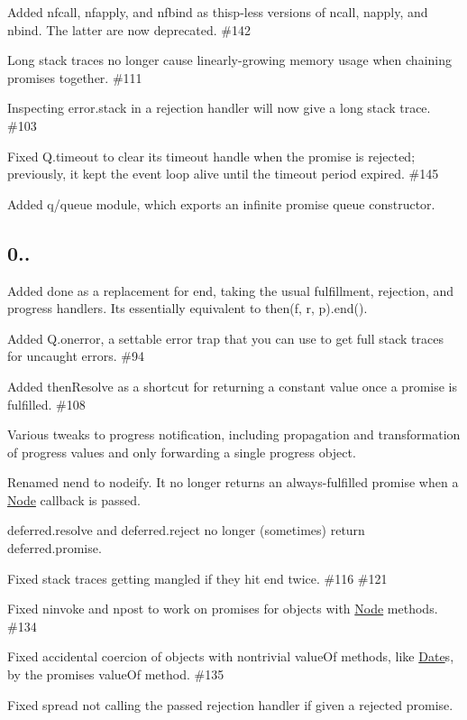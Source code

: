 \begin{DoxyItemize}
\item Added {\ttfamily nfcall}, {\ttfamily nfapply}, and {\ttfamily nfbind} as {\ttfamily thisp}-\/less versions of {\ttfamily ncall}, {\ttfamily napply}, and {\ttfamily nbind}. The latter are now deprecated. \#142
\item Long stack traces no longer cause linearly-\/growing memory usage when chaining promises together. \#111
\item Inspecting {\ttfamily error.\+stack} in a rejection handler will now give a long stack trace. \#103
\item Fixed {\ttfamily Q.\+timeout} to clear its timeout handle when the promise is rejected; previously, it kept the event loop alive until the timeout period expired. \#145 
\item Added {\ttfamily q/queue} module, which exports an infinite promise queue constructor.
\end{DoxyItemize}

\subsection*{0..}


\begin{DoxyItemize}
\item Added {\ttfamily done} as a replacement for {\ttfamily end}, taking the usual fulfillment, rejection, and progress handlers. It\textquotesingle{}s essentially equivalent to {\ttfamily then(f, r, p).end()}.
\item Added {\ttfamily Q.\+onerror}, a settable error trap that you can use to get full stack traces for uncaught errors. \#94
\item Added {\ttfamily then\+Resolve} as a shortcut for returning a constant value once a promise is fulfilled. \#108 
\item Various tweaks to progress notification, including propagation and transformation of progress values and only forwarding a single progress object.
\item Renamed {\ttfamily nend} to {\ttfamily nodeify}. It no longer returns an always-\/fulfilled promise when a \mbox{\hyperlink{classNode}{Node}} callback is passed.
\item {\ttfamily deferred.\+resolve} and {\ttfamily deferred.\+reject} no longer (sometimes) return {\ttfamily deferred.\+promise}.
\item Fixed stack traces getting mangled if they hit {\ttfamily end} twice. \#116 \#121 
\item Fixed {\ttfamily ninvoke} and {\ttfamily npost} to work on promises for objects with \mbox{\hyperlink{classNode}{Node}} methods. \#134
\item Fixed accidental coercion of objects with nontrivial {\ttfamily value\+Of} methods, like {\ttfamily \mbox{\hyperlink{classDate}{Date}}}s, by the promise\textquotesingle{}s {\ttfamily value\+Of} method. \#135
\item Fixed {\ttfamily spread} not calling the passed rejection handler if given a rejected promise.
\end{DoxyItemize}

